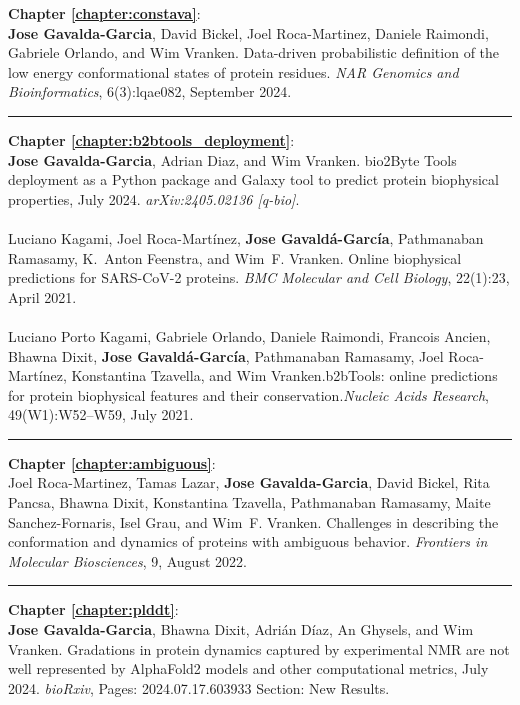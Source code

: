 \noindent
\textbf{Chapter \ref{chapter:constava}}:
\\
\textbf{Jose Gavalda-Garcia}, David Bickel, Joel Roca-Martinez, Daniele Raimondi, Gabriele Orlando, and Wim Vranken. Data-driven probabilistic definition of the low energy conformational states of protein residues.
\textit{NAR Genomics and Bioinformatics}, 6(3):lqae082, September 2024. 
\vspace{0.8 em}
\hrule
\vspace{0.8 em}
\noindent
\textbf{Chapter \ref{chapter:b2btools_deployment}}:
\\
\textbf{Jose Gavalda-Garcia}, Adrian Diaz, and Wim Vranken. bio2Byte Tools deployment as a Python package and Galaxy tool to predict protein biophysical properties, July 2024. \textit{arXiv:2405.02136 [q-bio]}.
\\
\\
Luciano Kagami, Joel Roca-Martínez, \textbf{Jose Gavaldá-García}, Pathmanaban Ramasamy, K.~Anton Feenstra, and Wim~F. Vranken. Online biophysical predictions for {SARS}-{CoV}-2 proteins. \textit{BMC Molecular and Cell Biology}, 22(1):23, April 2021.
\\
\\
Luciano Porto Kagami, Gabriele Orlando, Daniele Raimondi, Francois Ancien, Bhawna Dixit, \textbf{Jose Gavaldá-García}, Pathmanaban Ramasamy, Joel Roca-Martínez, Konstantina Tzavella, and Wim Vranken.{b2bTools}: online predictions for protein biophysical features and their conservation.\textit{Nucleic Acids Research}, 49(W1):W52--W59, July 2021.
\vspace{0.8 em}
\hrule
\vspace{0.8 em}
\noindent
\textbf{Chapter \ref{chapter:ambiguous}}:
\\
Joel Roca-Martinez, Tamas Lazar, \textbf{Jose Gavalda-Garcia}, David Bickel, Rita Pancsa, Bhawna Dixit, Konstantina Tzavella, Pathmanaban Ramasamy, Maite Sanchez-Fornaris, Isel Grau, and Wim~F. Vranken.
Challenges in describing the conformation and dynamics of proteins with ambiguous behavior. \textit{Frontiers in Molecular Biosciences}, 9, August 2022.
\vspace{0.8 em}
\hrule
\vspace{0.8 em}
\noindent
\textbf{Chapter \ref{chapter:plddt}}:
\\
\textbf{Jose Gavalda-Garcia}, Bhawna Dixit, Adrián Díaz, An Ghysels, and Wim Vranken. Gradations in protein dynamics captured by experimental NMR are not well represented by AlphaFold2 models and other computational metrics, July 2024. \textit{bioRxiv}, Pages: 2024.07.17.603933 Section: New Results.
